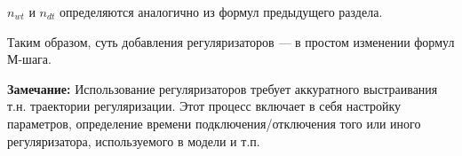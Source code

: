  	 $n_{wt}$ и $n_{dt}$ определяются аналогично из формул предыдущего раздела.
 	 
Таким образом, суть добавления регуляризаторов --- в простом изменении формул М-шага.

{\bf Замечание:} Использование регуляризаторов требует аккуратного выстраивания т.н. траектории регуляризации. Этот процесс включает в себя настройку параметров, определение времени подключения/отключения того или иного регуляризатора, используемого в модели и т.п.